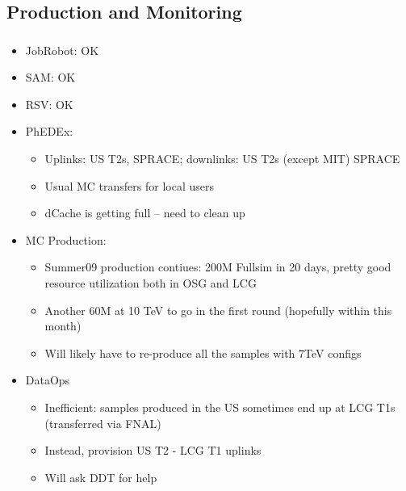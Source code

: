 \documentclass{beamer}
\begin{document}
\subsection{Production and Monitoring}
\begin{frame}
\frametitle{}
\begin{itemize}
	\item JobRobot: OK
	\item SAM: OK
	\item RSV: OK
	\item PhEDEx:
	\begin{itemize}
		\item Uplinks: US T2s, SPRACE; downlinks: US T2s (except MIT) SPRACE
		\item Usual MC transfers for local users
		\item dCache is getting full -- need to clean up
	\end{itemize}
	\item MC Production:
	\begin{itemize}
		\item Summer09 production contiues: 200M Fullsim in 20 days, pretty good resource utilization both in OSG and LCG
		\item Another 60M at 10 TeV to go in the first round (hopefully within this month)
		\item Will likely have to re-produce all the samples with 7TeV configs
	\end{itemize}
	\item DataOps
	\begin{itemize}
		\item Inefficient: samples produced in the US sometimes end up at LCG T1s (transferred via FNAL)
		\item Instead, provision US T2 - LCG T1 uplinks
		\item Will ask DDT for help
	\end{itemize}
\end{itemize}
\end{frame}
\end{document}
